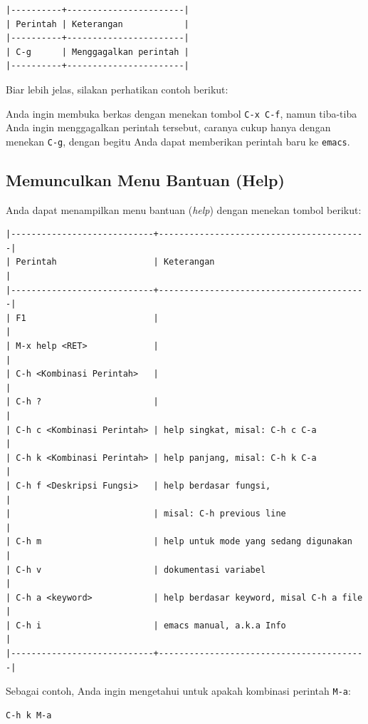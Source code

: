 \documentclass{article}
\begin{document}
\begin{verbatim}
|----------+-----------------------|
| Perintah | Keterangan            |
|----------+-----------------------|
| C-g      | Menggagalkan perintah |
|----------+-----------------------|
\end{verbatim}

Biar lebih jelas, silakan perhatikan contoh berikut:

Anda ingin membuka berkas dengan menekan tombol \verb=C-x C-f=, namun 
tiba-tiba Anda ingin menggagalkan perintah tersebut, caranya cukup hanya
dengan menekan \verb=C-g=, dengan begitu Anda dapat memberikan perintah
baru ke \verb=emacs=.

\subsection{Memunculkan Menu Bantuan (Help)}
Anda dapat menampilkan menu bantuan (\emph{help}) dengan menekan tombol
berikut:

\begin{verbatim}
|----------------------------+-----------------------------------------|
| Perintah                   | Keterangan                              |
|----------------------------+-----------------------------------------|
| F1                         |                                         |
| M-x help <RET>             |                                         |
| C-h <Kombinasi Perintah>   |                                         |
| C-h ?                      |                                         |
| C-h c <Kombinasi Perintah> | help singkat, misal: C-h c C-a          |
| C-h k <Kombinasi Perintah> | help panjang, misal: C-h k C-a          |
| C-h f <Deskripsi Fungsi>   | help berdasar fungsi,                   |
|                            | misal: C-h previous line                |
| C-h m                      | help untuk mode yang sedang digunakan   |
| C-h v                      | dokumentasi variabel                    |
| C-h a <keyword>            | help berdasar keyword, misal C-h a file |
| C-h i                      | emacs manual, a.k.a Info                |
|----------------------------+-----------------------------------------|
\end{verbatim}

Sebagai contoh, Anda ingin mengetahui untuk apakah kombinasi perintah
\verb=M-a=:

\begin{verbatim}
C-h k M-a
\end{verbatim}
\end{document}
